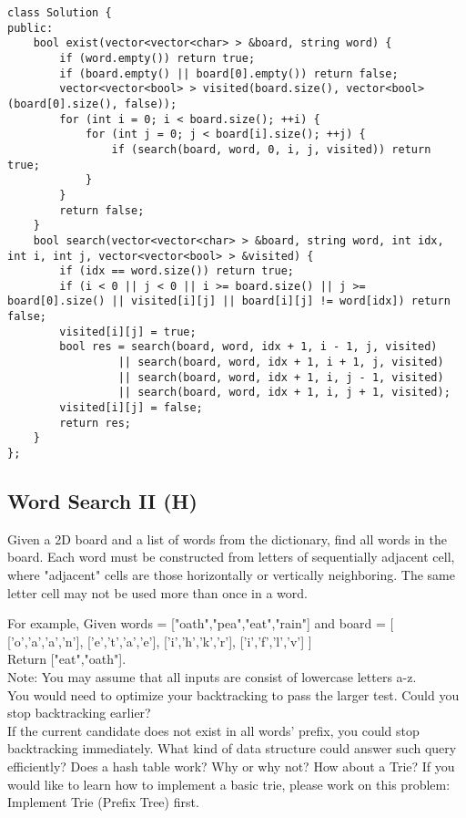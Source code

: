 \begin{lstlisting}
class Solution {
public:
    bool exist(vector<vector<char> > &board, string word) {
        if (word.empty()) return true;
        if (board.empty() || board[0].empty()) return false;
        vector<vector<bool> > visited(board.size(), vector<bool>(board[0].size(), false));
        for (int i = 0; i < board.size(); ++i) {
            for (int j = 0; j < board[i].size(); ++j) {
                if (search(board, word, 0, i, j, visited)) return true;
            }
        }
        return false;
    }
    bool search(vector<vector<char> > &board, string word, int idx, int i, int j, vector<vector<bool> > &visited) {
        if (idx == word.size()) return true;
        if (i < 0 || j < 0 || i >= board.size() || j >= board[0].size() || visited[i][j] || board[i][j] != word[idx]) return false;
        visited[i][j] = true;
        bool res = search(board, word, idx + 1, i - 1, j, visited) 
                 || search(board, word, idx + 1, i + 1, j, visited)
                 || search(board, word, idx + 1, i, j - 1, visited)
                 || search(board, word, idx + 1, i, j + 1, visited);
        visited[i][j] = false;
        return res;
    }
};
\end{lstlisting}


\subsection{Word Search II (H)}
Given a 2D board and a list of words from the dictionary, find all words in the board. Each word must be constructed from letters of sequentially adjacent cell, where "adjacent" cells are those horizontally or vertically neighboring. The same letter cell may not be used more than once in a word.

For example,
Given words = ["oath","pea","eat","rain"] and board =
[
  ['o','a','a','n'],
  ['e','t','a','e'],
  ['i','h','k','r'],
  ['i','f','l','v']
]\\

Return ["eat","oath"].\\

Note:
You may assume that all inputs are consist of lowercase letters a-z.\\

You would need to optimize your backtracking to pass the larger test. Could you stop backtracking earlier?\\

If the current candidate does not exist in all words' prefix, you could stop backtracking immediately. What kind of data structure could answer such query efficiently? Does a hash table work? Why or why not? How about a Trie? If you would like to learn how to implement a basic trie, please work on this problem: Implement Trie (Prefix Tree) first.\\

